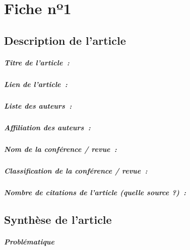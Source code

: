 
\chapter{Fiche nº1} %
\label{app:Fiche1} %

\section{Description de l'article}

\paragraph{Titre de l'article~:}
\paragraph{Lien de l'article~:}
\paragraph{Liste des auteurs~:}
\paragraph{Affiliation des auteurs~:}
\paragraph{Nom de la conférence / revue~:}
\paragraph{Classification de la conférence / revue~:}
\paragraph{Nombre de citations de l'article (quelle source ?)~:}



\section{Synthèse de l'article}

\paragraph{Problématique}
\lipsum[1]

